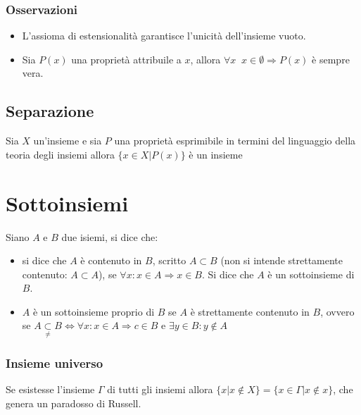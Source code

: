 \subsubsection{Osservazioni}
\begin{itemize}
\item L'assioma di estensionalit\`a garantisce l'unicit\`a dell'insieme vuoto.
\item Sia $P(x)$ una propriet\`a attribuile a $x$, allora $\forall x\;\; x\in\emptyset\Rightarrow P(x)$ \`e sempre vera.
\end{itemize}
\subsection{Separazione}
Sia $X$ un'insieme e sia $P$ una propriet\`a esprimibile in termini del linguaggio della teoria degli insiemi allora $\{x\in X|P(x)\}$ \`e un insieme
\section{Sottoinsiemi}
Siano $A$ e $B$ due isiemi, si dice che:
\begin{itemize}
\item si dice che $A$ \`e contenuto in $B$, scritto $A\subset B$ (non si intende strettamente contenuto: $A\subset A$), se $\forall x:x\in A\Rightarrow x\in B$. Si dice che $A$
\`e un sottoinsieme di $B$.
\item $A$ \`e un sottoinsieme proprio di $B$ se $A$ \`e strettamente contenuto in $B$, ovvero se $A\underset{\neq}{\subset}B\Leftrightarrow \forall x:x\in A\Rightarrow c\in B$ e 
$\exists y \in B:y\not\in A$
\end{itemize}
\subsubsection{Insieme universo}
Se esistesse l'insieme $\Gamma$ di tutti gli insiemi allora $\{x|x\not\in X\}=\{x\in\Gamma|x\not\in x\}$, che genera un paradosso di Russell.
